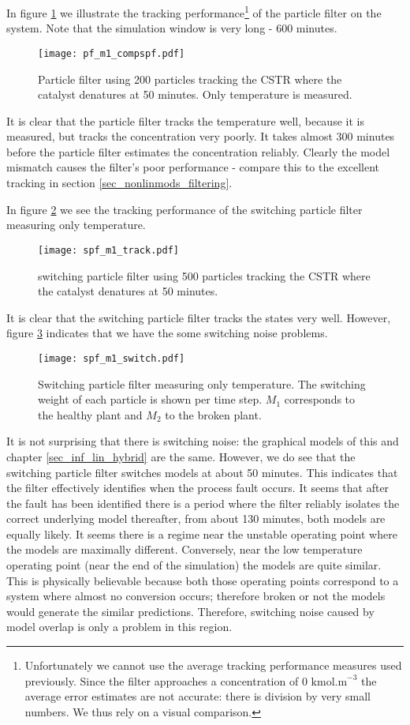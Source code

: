 In figure \ref{fig_pf_m1_compspf} we illustrate the tracking performance\footnote{Unfortunately we cannot use the average tracking performance measures used previously. Since the filter approaches a concentration of 0 $\text{kmol.m}^{-3}$ the average error estimates are not accurate: there is division by very small numbers. We thus rely on a visual comparison.} of the particle filter on the system. Note that the simulation window is very long - 600 minutes.
\begin{figure}[H] 
\centering
\texttt{[image: pf\_m1\_compspf.pdf]}
\caption{Particle filter using 200 particles tracking the CSTR where the catalyst denatures at 50 minutes. Only temperature is measured.}
\label{fig_pf_m1_compspf}
\end{figure}
It is clear that the particle filter tracks the temperature well, because it is measured, but tracks the concentration very poorly. It takes almost 300 minutes before the particle filter estimates the concentration reliably. Clearly the model mismatch causes the filter's poor performance - compare this to the excellent tracking in section \ref{sec_nonlinmods_filtering}.

In figure \ref{fig_spf_m1_track} we see the tracking performance of the switching particle filter measuring only temperature.
\begin{figure}[H] 
\centering
\texttt{[image: spf\_m1\_track.pdf]}
\caption{switching particle filter using 500 particles tracking the CSTR where the catalyst denatures at 50 minutes.}
\label{fig_spf_m1_track}
\end{figure}
It is clear that the switching particle filter tracks the states very well. However, figure \ref{fig_spf_m1_switch} indicates that we have the some switching noise problems.
\begin{figure}[H] 
\centering
\texttt{[image: spf\_m1\_switch.pdf]}
\caption{Switching particle filter measuring only temperature. The switching weight of each particle is shown per time step. $M_1$ corresponds to the healthy plant and $M_2$ to the broken plant.}
\label{fig_spf_m1_switch}
\end{figure} 
It is not surprising that there is switching noise: the graphical models of this and chapter \ref{sec_inf_lin_hybrid} are the same. However, we do see that the switching particle filter switches models at about 50 minutes. This indicates that the filter effectively identifies when the process fault occurs. It seems that after the fault has been identified there is a period where the filter reliably isolates the correct underlying model thereafter, from about 130 minutes, both models are equally likely. It seems there is a regime near the unstable operating point where the models are maximally different. Conversely, near the low temperature operating point (near the end of the simulation) the models are quite similar. This is physically believable because both those operating points correspond to a system where almost no conversion occurs; therefore broken or not the models would generate the similar predictions. Therefore, switching noise caused by model overlap is only a problem in this region.

